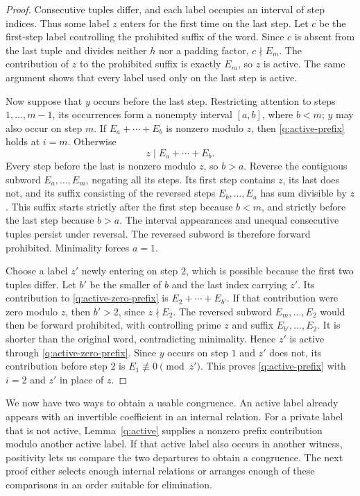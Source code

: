 \begin{proof}
Consecutive tuples differ, and each label occupies an interval of step
indices.  Thus some label $z$ enters for the first time on the last
step.  Let $c$ be the first-step label controlling the prohibited suffix
of the word.  Since $c$ is absent from the last tuple and divides neither
$h$ nor a padding factor, $c\nmid E_m$.  The contribution of $z$ to the
prohibited suffix is exactly $E_m$, so $z$ is active.  The same argument
shows that every label used only on the last step is active.

Now suppose that $y$ occurs before the last step.  Restricting attention
to steps $1,\ldots,m-1$, its occurrences form a nonempty interval
$[a,b]$, where $b<m$; $y$ may also occur on step $m$.
If $E_a+\cdots+E_b$ is nonzero modulo $z$, then
\eqref{q:active-prefix} holds at $i=m$.  Otherwise
\begin{equation}\label{q:active-zero-prefix}
 z\mid E_a+\cdots+E_b.
\end{equation}
Every step before the last is nonzero modulo $z$, so $b>a$.
Reverse the contiguous subword $E_a,\ldots,E_m$, negating all its steps.
Its first step contains $z$, its last does not, and its suffix consisting
of the reversed steps $E_b,\ldots,E_a$ has sum divisible by $z$.
This suffix starts strictly after the first step because $b<m$, and
strictly before the last step because $b>a$.  The interval appearances
and unequal consecutive tuples persist under reversal.  The reversed
subword is therefore forward prohibited.  Minimality forces $a=1$.

Choose a label $z'$ newly entering on step $2$, which is possible because
the first two tuples differ.  Let $b'$ be the smaller of $b$ and the last
index carrying $z'$.  Its contribution to \eqref{q:active-zero-prefix}
is $E_2+\cdots+E_{b'}$.  If that contribution were zero modulo $z$,
then $b'>2$, since $z\nmid E_2$.  The reversed subword
$E_m,\ldots,E_2$ would then be forward prohibited, with controlling
prime $z$ and suffix $E_{b'},\ldots,E_2$.  It is shorter than the
original word, contradicting minimality.  Hence $z'$ is active through
\eqref{q:active-zero-prefix}.  Since $y$ occurs on step $1$ and $z'$ does
not, its contribution before step $2$ is $E_1\not\equiv0\pmod{z'}$.
This proves \eqref{q:active-prefix} with $i=2$ and $z'$ in place of $z$.
\end{proof}

We now have two ways to obtain a usable congruence.  An active label
already appears with an invertible coefficient in an internal relation.
For a private label that is not active, Lemma~\ref{q:active} supplies a
nonzero prefix contribution modulo another active label.  If that active
label also occurs in another witness, positivity lets us compare the
two departures to obtain a congruence.  The next proof either selects
enough internal relations or arranges enough of these comparisons in
an order suitable for elimination.


